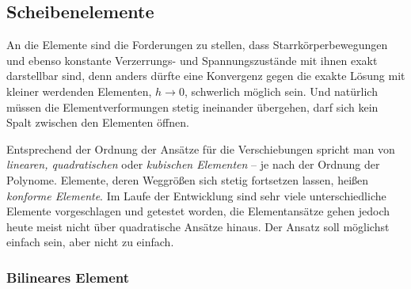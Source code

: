 {%
{\textcolor{sectionTitleBlue}{\section{Scheibenelemente}}}\label{Scheibenelemente}
An die Elemente sind  die Forderungen zu stellen, dass Starrk\"{o}rperbewegungen und ebenso konstante Verzerrungs- und Spannungszust\"{a}nde mit ihnen exakt darstellbar sind, denn anders d\"{u}rfte eine Konvergenz gegen die exakte L\"{o}sung mit kleiner werdenden Elementen, $h \rightarrow 0$, schwerlich m\"{o}glich sein. Und nat\"{u}rlich m\"{u}ssen die Elementverformungen stetig ineinander \"{u}bergehen, darf sich kein Spalt zwischen den Elementen \"{o}ffnen. 

Entsprechend der Ordnung der Ans\"{a}tze f\"{u}r die Verschiebungen spricht man von {\em linearen, quadratischen\/} oder {\em kubischen Elementen\/} -- je nach der Ordnung der Polynome. Elemente, deren Weggr\"{o}{\ss}en sich stetig fortsetzen lassen, hei{\ss}en {\em konforme Elemente\/}. Im Laufe der Entwicklung sind sehr viele unterschiedliche Elemente vorgeschlagen und getestet worden, die Elementans\"{a}tze gehen jedoch heute meist nicht \"{u}ber quadratische Ans\"{a}tze hinaus. Der Ansatz soll m\"{o}glichst einfach sein, aber nicht \glq zu einfach\grq.


{\textcolor{sectionTitleBlue}{\subsubsection*{Bilineares Element}}}

}
